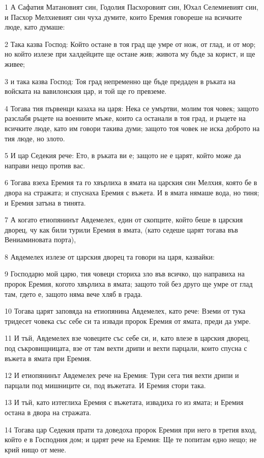 \par 1 А Сафатия Матановият син, Годолия Пасхоровият син, Юхал Селемиевият син, и Пасхор Мелхиевият син чуха думите, които Еремия говореше на всичките люде, като думаше:
\par 2 Така казва Господ: Който остане в тоя град ще умре от нож, от глад, и от мор; но който излезе при халдейците ще остане жив; живота му бъде за корист, и ще живее;
\par 3 и така казва Господ: Тоя град непременно ще бъде предаден в ръката на войската на вавилонския цар, и той ще го превземе.
\par 4 Тогава тия първенци казаха на царя: Нека се умъртви, молим тоя човек; защото разслабя ръцете на военните мъже, които са останали в тоя град, и ръцете на всичките люде, като им говори такива думи; защото тоя човек не иска доброто на тия люде, но злото.
\par 5 И цар Седекия рече: Ето, в ръката ви е; защото не е царят, който може да направи нещо против вас.
\par 6 Тогава взеха Еремия та го хвърлиха в ямата на царския син Мелхия, която бе в двора на стражата; и спуснаха Еремия с въжета. И в ямата нямаше вода, но тиня; и Еремия затъна в тинята.
\par 7 А когато етиопянинът Авдемелех, един от скопците, който беше в царския дворец, чу как били турили Еремия в ямата, (като седеше царят тогава във Вениаминовата порта),
\par 8 Авдемелех излезе от царския дворец та говори на царя, казвайки:
\par 9 Господарю мой царю, тия човеци сториха зло във всичко, що направиха на пророк Еремия, когото хвърлиха в ямата; защото той без друго ще умре от глад там, гдето е, защото няма вече хляб в града.
\par 10 Тогава царят заповяда на етиопянина Авдемелех, като рече: Вземи от тука тридесет човека със себе си та извади пророк Еремия от ямата, преди да умре.
\par 11 И тъй, Авдемелех взе човеците със себе си, и, като влезе в царския дворец, под съкровищницата, взе от там вехти дрипи и вехти парцали, които спусна с въжета в ямата при Еремия.
\par 12 И етиопянинът Авдемелех рече на Еремия: Тури сега тия вехти дрипи и парцали под мишниците си, под въжетата. И Еремия стори така.
\par 13 И тъй, като изтеглиха Еремия с въжетата, извадиха го из ямата; и Еремия остана в двора на стражата.
\par 14 Тогава цар Седекия прати та доведоха пророк Еремия при него в третия вход, който е в Господния дом; и царят рече на Еремия: Ще те попитам едно нещо; не крий нищо от мене.

